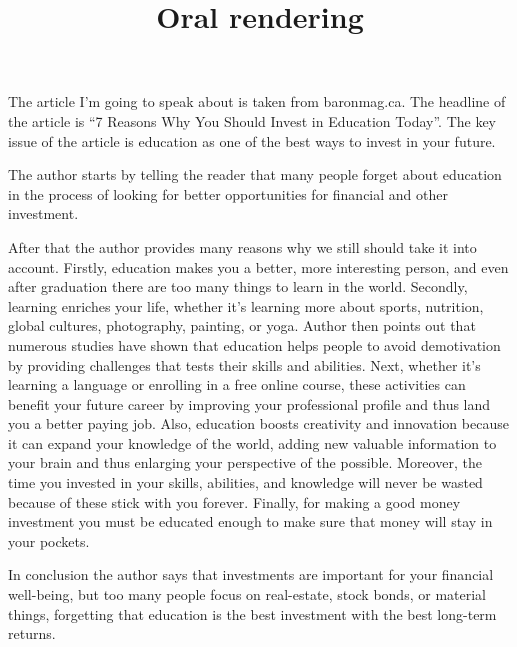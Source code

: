 \documentclass[a4paper]{article}
\title{Oral rendering}
\begin{document}
	\maketitle
{}
\noindent
The article I’m going to speak about is taken from baronmag.ca. The headline of the article is “7 Reasons Why You Should Invest in Education Today”. The key issue of the article is education as one of the best ways to invest in your future.


The author starts by telling the reader that many people forget about education in the process of looking for better opportunities for financial and other investment.


After that the author provides many reasons why we still should take it into account. Firstly, education makes you a better, more interesting person, and even after graduation there are too many things to learn in the world. Secondly, learning enriches your life, whether it’s learning more about sports, nutrition, global cultures, photography, painting, or yoga. Author then points out that numerous studies have shown that education helps people to avoid demotivation by providing challenges that tests their skills and abilities. Next, whether it’s learning a language or enrolling in a free online course, these activities can benefit your future career by improving your professional profile and thus land you a better paying job. Also, education boosts creativity and innovation because it can expand your knowledge of the world, adding new valuable information to your brain and thus enlarging your perspective of the possible. Moreover, the time you invested in your skills, abilities, and knowledge will never be wasted because of these stick with you forever. Finally, for making a good money investment you must be educated enough to make sure that money will stay in your pockets.


In conclusion the author says that investments are important for your financial well-being, but too many people focus on real-estate, stock bonds, or material things, forgetting that education is the best investment with the best long-term returns.
\end{document}
